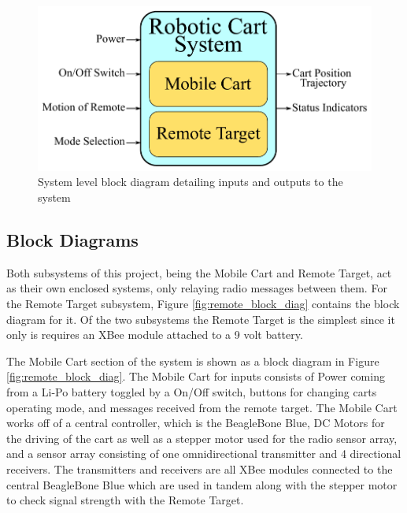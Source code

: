 \documentclass[letterpaper,12pt]{article}   %
\begin{document}
\begin{figure}[!h]
    \centering
    \includegraphics[scale=0.9]{figs/system_block_diagram_2}
    \caption{System level block diagram detailing inputs and outputs to the system}
	\label{fig:sys_block_diag}
\end{figure}

\vspace*{12pt}
\subsection{Block Diagrams}
\hspace{\parindent} Both subsystems of this project, being the Mobile Cart and Remote Target, act as their own enclosed systems, only relaying radio messages between them. For the Remote Target subsystem, Figure \ref{fig:remote_block_diag} contains the block diagram for it. Of the two subsystems the Remote Target is the simplest since it only is requires an XBee module attached to a 9 volt battery.

\hspace{\parindent} The Mobile Cart section of the system is shown as a block diagram in Figure \ref{fig:remote_block_diag}. The Mobile Cart for inputs consists of Power coming from a Li-Po battery toggled by a On/Off switch, buttons for changing carts operating mode, and messages received from the remote target. The Mobile Cart works off of a central controller, which is the BeagleBone Blue, DC Motors for the driving of the cart as well as a stepper motor used for the radio sensor array, and a sensor array consisting of one omnidirectional transmitter and 4 directional receivers. The transmitters and receivers are all XBee modules connected to the central BeagleBone Blue which are used in tandem along with the stepper motor to check signal strength with the Remote Target.
\end{document}
